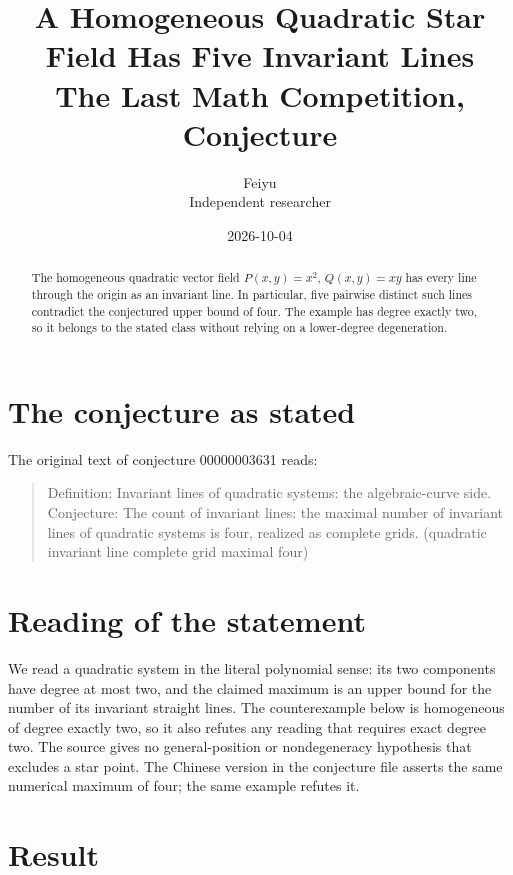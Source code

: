 \documentclass[11pt]{article}
\title{A Homogeneous Quadratic Star Field Has Five Invariant Lines\\[0.4em]\large The Last Math Competition, Conjecture \conjid}
\author{Feiyu\\ \small Independent researcher}
\date{2026-10-04}
\theoremstyle{plain}
\theoremstyle{definition}
\theoremstyle{remark}
\newcommand{\conjid}{00000003631}
\begin{document}
\maketitle

\begin{abstract}
The homogeneous quadratic vector field $P(x,y)=x^2$, $Q(x,y)=xy$ has every line through the origin as an invariant line. In particular, five pairwise distinct such lines contradict the conjectured upper bound of four. The example has degree exactly two, so it belongs to the stated class without relying on a lower-degree degeneration.
\end{abstract}

\section{The conjecture as stated}

The original text of conjecture \conjid{} reads:

\begin{quote}
Definition: Invariant lines of quadratic systems: the algebraic-curve side. Conjecture: The count of invariant lines: the maximal number of invariant lines of quadratic systems is four, realized as complete grids. (quadratic invariant line complete grid maximal four)
\end{quote}

\section{Reading of the statement}


We read a quadratic system in the literal polynomial sense: its two components have degree at most two, and the claimed maximum is an upper bound for the number of its invariant straight lines. The counterexample below is homogeneous of degree exactly two, so it also refutes any reading that requires exact degree two. The source gives no general-position or nondegeneracy hypothesis that excludes a star point. The Chinese version in the conjecture file asserts the same numerical maximum of four; the same example refutes it.

\section{Result}
\end{document}
